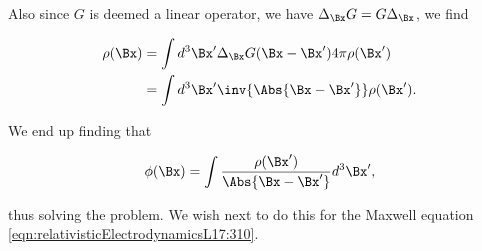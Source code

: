 Also since $G$ is deemed a linear operator, we have $\Delta_\Bx G = G \Delta_\Bx$, we find

\begin{align*}
\rho(\Bx)
&=
\int d^3 \Bx' \Delta_{\Bx} G(\Bx - \Bx') 4 \pi \rho(\Bx') \\
&=
\int d^3 \Bx' \inv{\Abs{\Bx - \Bx'}} \rho(\Bx').
\end{align*}

We end up finding that 

\begin{equation}\label{eqn:relativisticElectrodynamicsL17:390}
\phi(\Bx) = \int \frac{\rho(\Bx')}{\Abs{\Bx - \Bx'}} d^3 \Bx',
\end{equation}

thus solving the problem.  We wish next to do this for the Maxwell equation \ref{eqn:relativisticElectrodynamicsL17:310}.

\EndArticle
